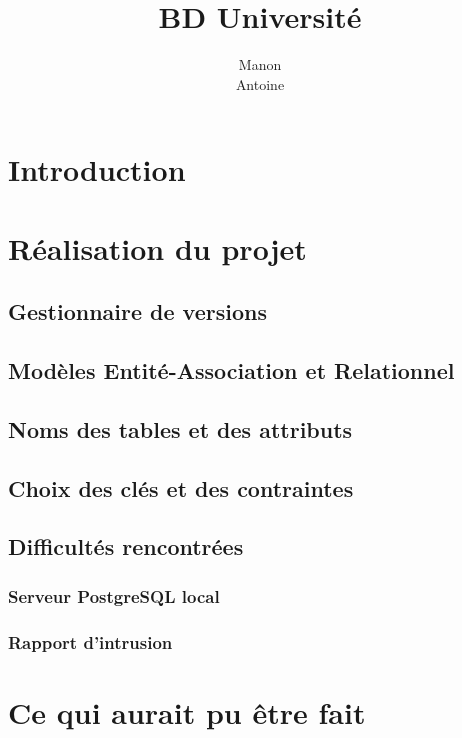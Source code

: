 \documentclass[12pt,titlepage,a4paper]{report}
\title{BD Université}
\author{Manon \bsc{Ansart}\\ Antoine \bsc{Augusti}}
\begin{document}

	\dominitoc
	\tableofcontents

	\chapter{Introduction}
		

	\chapter{Réalisation du projet}
		\section{Gestionnaire de versions}
		

		\section{Modèles Entité-Association et Relationnel}
		

		\section{Noms des tables et des attributs}
		

		\section{Choix des clés et des contraintes}
		

		\section{Difficultés rencontrées}  
			\subsection{Serveur PostgreSQL local}
			
			
			\subsection{Rapport d'intrusion}
			

	\chapter{Ce qui aurait pu être fait}
\end{document}
